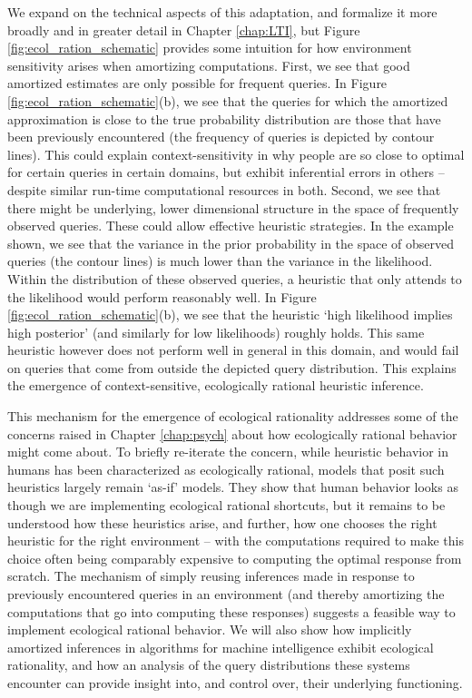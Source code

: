 We expand on the technical aspects of this adaptation, and formalize it more broadly and in greater detail in Chapter \ref{chap:LTI}, but Figure \ref{fig:ecol_ration_schematic} provides some intuition for how environment sensitivity arises when amortizing computations. First, we see that good amortized estimates are only possible for frequent queries. In Figure \ref{fig:ecol_ration_schematic}(b), we see that the queries for which the amortized approximation is close to the true probability distribution are those that have been previously encountered (the frequency of queries is depicted by contour lines). This could explain context-sensitivity in why people are so close to optimal for certain queries in certain domains, but exhibit inferential errors in others -- despite similar run-time computational resources in both. Second, we see that there might be underlying, lower dimensional structure in the space of frequently observed queries. These could allow effective heuristic strategies. In the example shown, we see that the variance in the prior probability in the space of observed queries (the contour lines) is much lower than the variance in the likelihood. Within the distribution of these observed queries, a heuristic that only attends to the likelihood would perform reasonably well. In Figure \ref{fig:ecol_ration_schematic}(b), we see that the heuristic `high likelihood implies high posterior' (and similarly for low likelihoods) roughly holds. This same heuristic however does not perform well in general in this domain, and would fail on queries that come from outside the depicted query distribution. This explains the emergence of context-sensitive, ecologically rational heuristic inference.

This mechanism for the emergence of ecological rationality addresses some of the concerns raised in Chapter \ref{chap:psych} about how ecologically rational behavior might come about. To briefly re-iterate the concern, while heuristic behavior in humans has been characterized as ecologically rational\cite{gigerenzer2008heuristics}, models that posit such heuristics largely remain `as-if' models. They show that human behavior looks as though we are implementing ecological rational shortcuts, but it remains to be understood how these heuristics arise, and further, how one chooses the right heuristic for the right environment -- with the computations required to make this choice often being comparably expensive to computing the optimal response from scratch\cite{hay2014selecting, horvitz1989reflection}. The mechanism of simply reusing inferences made in response to previously encountered queries in an environment (and thereby amortizing the computations that go into computing these responses) suggests a feasible way to implement ecological rational behavior. We will also show how implicitly amortized inferences in algorithms for machine intelligence exhibit ecological rationality, and how an analysis of the query distributions these systems encounter can provide insight into, and control over, their underlying functioning.

